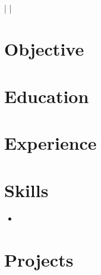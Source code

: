 \documentclass[11pt]{article}
\begin{document}
\begin{center}
    \huge{\textbf{}} \\
    \vspace{0.5em}
    \href{mailto:\VAR{email}}{} \quad | \quad
     \quad | \quad
\end{center}

\section*{Objective}

\section*{Education}
\begin{itemize}[leftmargin=*]
\end{itemize}

\section*{Experience}
\begin{itemize}[leftmargin=*]
\end{itemize}

\section*{Skills}
\begin{itemize}[leftmargin=*]
    \item {}
\end{itemize}

\section*{Projects}
\begin{itemize}[leftmargin=*]
\end{itemize}
\end{document}

